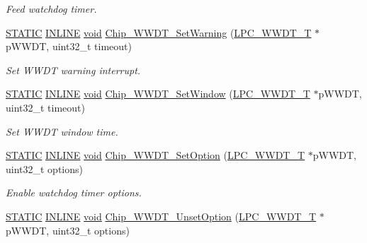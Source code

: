 \begin{DoxyCompactItemize}
\begin{DoxyCompactList}\small\item\em Feed watchdog timer. \end{DoxyCompactList}\item 
\hyperlink{group__LPC__Types__Public__Macros_ga10b2d890d871e1489bb02b7e70d9bdfb}{S\-T\-A\-T\-I\-C} \hyperlink{group__LPC__Types__Public__Types_ga2eb6f9e0395b47b8d5e3eeae4fe0c116}{I\-N\-L\-I\-N\-E} \hyperlink{Paradigm_2Tern__EE_2small_2portmacro_8h_a14d32f8130d3c0b212cfc751730b5b49}{void} \hyperlink{group__WWDT__17XX__40XX_ga83ecb3bc2ce68b3deb8343a7d76e3d7e}{Chip\-\_\-\-W\-W\-D\-T\-\_\-\-Set\-Warning} (\hyperlink{structLPC__WWDT__T}{L\-P\-C\-\_\-\-W\-W\-D\-T\-\_\-\-T} $\ast$p\-W\-W\-D\-T, uint32\-\_\-t timeout)
\begin{DoxyCompactList}\small\item\em Set W\-W\-D\-T warning interrupt. \end{DoxyCompactList}\item 
\hyperlink{group__LPC__Types__Public__Macros_ga10b2d890d871e1489bb02b7e70d9bdfb}{S\-T\-A\-T\-I\-C} \hyperlink{group__LPC__Types__Public__Types_ga2eb6f9e0395b47b8d5e3eeae4fe0c116}{I\-N\-L\-I\-N\-E} \hyperlink{Paradigm_2Tern__EE_2small_2portmacro_8h_a14d32f8130d3c0b212cfc751730b5b49}{void} \hyperlink{group__WWDT__17XX__40XX_gaad121c7d4960ceec5626e8bad047c966}{Chip\-\_\-\-W\-W\-D\-T\-\_\-\-Set\-Window} (\hyperlink{structLPC__WWDT__T}{L\-P\-C\-\_\-\-W\-W\-D\-T\-\_\-\-T} $\ast$p\-W\-W\-D\-T, uint32\-\_\-t timeout)
\begin{DoxyCompactList}\small\item\em Set W\-W\-D\-T window time. \end{DoxyCompactList}\item 
\hyperlink{group__LPC__Types__Public__Macros_ga10b2d890d871e1489bb02b7e70d9bdfb}{S\-T\-A\-T\-I\-C} \hyperlink{group__LPC__Types__Public__Types_ga2eb6f9e0395b47b8d5e3eeae4fe0c116}{I\-N\-L\-I\-N\-E} \hyperlink{Paradigm_2Tern__EE_2small_2portmacro_8h_a14d32f8130d3c0b212cfc751730b5b49}{void} \hyperlink{group__WWDT__17XX__40XX_gab1908a91ca65434f14402e4a8373091f}{Chip\-\_\-\-W\-W\-D\-T\-\_\-\-Set\-Option} (\hyperlink{structLPC__WWDT__T}{L\-P\-C\-\_\-\-W\-W\-D\-T\-\_\-\-T} $\ast$p\-W\-W\-D\-T, uint32\-\_\-t options)
\begin{DoxyCompactList}\small\item\em Enable watchdog timer options. \end{DoxyCompactList}\item 
\hyperlink{group__LPC__Types__Public__Macros_ga10b2d890d871e1489bb02b7e70d9bdfb}{S\-T\-A\-T\-I\-C} \hyperlink{group__LPC__Types__Public__Types_ga2eb6f9e0395b47b8d5e3eeae4fe0c116}{I\-N\-L\-I\-N\-E} \hyperlink{Paradigm_2Tern__EE_2small_2portmacro_8h_a14d32f8130d3c0b212cfc751730b5b49}{void} \hyperlink{group__WWDT__17XX__40XX_gae71f59b4d6dfa847411bc74f5467946c}{Chip\-\_\-\-W\-W\-D\-T\-\_\-\-Unset\-Option} (\hyperlink{structLPC__WWDT__T}{L\-P\-C\-\_\-\-W\-W\-D\-T\-\_\-\-T} $\ast$p\-W\-W\-D\-T, uint32\-\_\-t options)

\end{DoxyCompactItemize}
